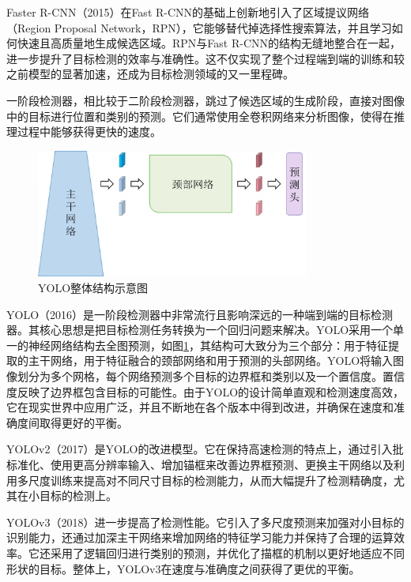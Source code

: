 Faster R-CNN\cite{ren2015faster}（2015）在Fast R-CNN的基础上创新地引入了区域提议网络（Region Proposal Network，RPN），它能够替代掉选择性搜索算法，并且学习如何快速且高质量地生成候选区域。RPN与Fast R-CNN的结构无缝地整合在一起，进一步提升了目标检测的效率与准确性。这不仅实现了整个过程端到端的训练和较之前模型的显著加速，还成为目标检测领域的又一里程碑。

一阶段检测器，相比较于二阶段检测器，跳过了候选区域的生成阶段，直接对图像中的目标进行位置和类别的预测。它们通常使用全卷积网络来分析图像，使得在推理过程中能够获得更快的速度。

\begin{figure}[htbp]
    \centering
    \includegraphics[width=0.8\textwidth]{figures/chap02_yolo.png}
    \caption{YOLO整体结构示意图}
    \label{fig:chap02_yolo}
\end{figure}

YOLO\cite{redmon2016you}（2016）是一阶段检测器中非常流行且影响深远的一种端到端的目标检测器。其核心思想是把目标检测任务转换为一个回归问题来解决。YOLO采用一个单一的神经网络结构去全图预测，如图\ref{fig:chap02_yolo}，其结构可大致分为三个部分：用于特征提取的主干网络，用于特征融合的颈部网络和用于预测的头部网络。YOLO将输入图像划分为多个网格，每个网络预测多个目标的边界框和类别以及一个置信度。置信度反映了边界框包含目标的可能性。由于YOLO的设计简单直观和检测速度高效，它在现实世界中应用广泛，并且不断地在各个版本中得到改进，并确保在速度和准确度间取得更好的平衡。

YOLOv2\cite{redmon2017yolo9000}（2017）是YOLO\cite{redmon2016you}的改进模型。它在保持高速检测的特点上，通过引入批标准化、使用更高分辨率输入、增加锚框来改善边界框预测、更换主干网络以及利用多尺度训练来提高对不同尺寸目标的检测能力，从而大幅提升了检测精确度，尤其在小目标的检测上。

YOLOv3\cite{redmon2018yolov3}（2018）进一步提高了检测性能。它引入了多尺度预测来加强对小目标的识别能力，还通过加深主干网络来增加网络的特征学习能力并保持了合理的运算效率。它还采用了逻辑回归进行类别的预测，并优化了描框的机制以更好地适应不同形状的目标。整体上，YOLOv3在速度与准确度之间获得了更优的平衡。

